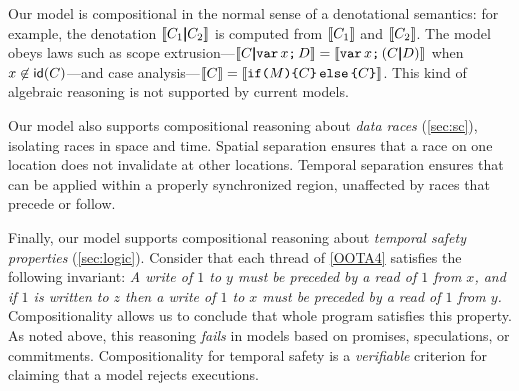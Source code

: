Our model is compositional in the normal sense of a denotational semantics:
for example, the denotation $\sem{C_1\!{\PAR}\! C_2}$ is computed from
$\llbracket C_1\rrbracket$ and $\llbracket C_2\rrbracket$.  The model obeys laws such as scope
extrusion---$\sem{\aCmd\!{\PAR}\! \VAR\aLoc\SEMI\bCmd} =
\sem{\VAR\aLoc\SEMI(\aCmd\!{\PAR}\!\bCmd)}$ when $x\not\in\mathsf{id}(C)$---and
case analysis---$\llbracket C\rrbracket = \llbracket\texttt{if}\allowbreak\texttt{(}M\texttt{)}\allowbreak\texttt{\{}C\texttt{\}}\,\allowbreak\texttt{else}\allowbreak\,\texttt{\{}C\texttt{\}}\rrbracket$.
This kind of algebraic reasoning is not supported by current models.

Our model also supports compositional reasoning about \emph{data races}
(\textsection\ref{sec:sc}), isolating races in space and time.  Spatial
separation ensures that a race on one location does not invalidate \drfsc{}
at other locations.  Temporal separation ensures that \drfsc{} can be applied
within a properly synchronized region, unaffected by races that precede or
follow.

Finally, our model supports compositional reasoning about \emph{temporal
  safety properties} (\textsection\ref{sec:logic}).  Consider that each
thread of \ref{OOTA4} satisfies the following invariant: \emph{A write of $1$
  to $y$ must be preceded by a read of $1$ from $x$, and if $1$ is written to
  $z$ then a write of $1$ to $x$ must be preceded by a read of $1$ from $y$.}
Compositionality allows us to conclude that whole program satisfies this
property.  As noted above, this reasoning \emph{fails} in models based on
promises, speculations, or commitments.
Compositionality for temporal safety is a \emph{verifiable} criterion for claiming that a model
rejects \oota{} executions.

